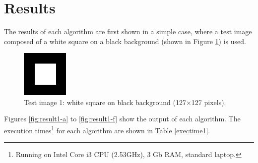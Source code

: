 \documentclass{ipol}
\numberwithin{equation}{section}
\numberwithin{table}{section}
\begin{document}

\section{Results}
\label{sec:results}

The results of each algorithm are first shown in a simple case, where a test image composed of a white square on a black background (shown in Figure \ref{fig:original1}) is used. 

\begin{figure}[h!]
	\centering
	\includegraphics[width=0.2\textwidth]{results/square127.png}
	\caption{Test image 1: white square on black background (127$\times$127 pixels).}
	\label{fig:original1}
\end{figure}

Figures \ref{fig:result1-a} to \ref{fig:result1-f} show the output of each algorithm. The execution times\footnote{Running on Intel Core i3 CPU (2.53GHz), 3 Gb RAM, standard laptop.} for each algorithm are shown in Table \ref{exectime1}. 
\end{document}

